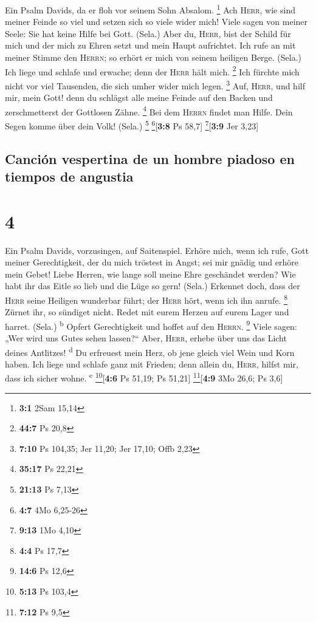  Ein Psalm Davids, da er floh vor seinem Sohn Absalom.
\footnote{\textbf{3:1} 2Sam 15,14}  Ach \textsc{Herr}, wie
sind meiner Feinde so viel und setzen sich so viele wider mich!
 Viele sagen von meiner Seele: Sie hat keine Hilfe bei
Gott. (Sela.)  Aber du, \textsc{Herr}, bist der Schild für
mich und der mich zu Ehren setzt und mein Haupt aufrichtet.
 Ich rufe an mit meiner Stimme den \textsc{Herrn}; so
erhört er mich von seinem heiligen Berge. (Sela.)  Ich
liege und schlafe und erwache; denn der \textsc{Herr} hält mich.
\footnote{\textbf{44:7} Ps 20,8}  Ich fürchte mich nicht
vor viel Tausenden, die sich umher wider mich legen. \footnote{\textbf{7:10}
  Ps 104,35; Jer 11,20; Jer 17,10; Offb 2,23}  Auf,
\textsc{Herr}, und hilf mir, mein Gott! denn du schlägst alle meine
Feinde auf den Backen und zerschmetterst der Gottlosen Zähne.
\footnote{\textbf{35:17} Ps 22,21}  Bei dem \textsc{Herrn}
findet man Hilfe. Dein Segen komme über dein Volk! (Sela.) \footnote{\textbf{21:13}
  Ps 7,13} \footnote{\textbf{4:7} 4Mo 6,25-26}{[}\textbf{3:8} Ps 58,7{]}
\footnote{\textbf{9:13} 1Mo 4,10}{[}\textbf{3:9} Jer 3,23{]}

\hypertarget{canciuxf3n-vespertina-de-un-hombre-piadoso-en-tiempos-de-angustia}{%
\subsection{Canción vespertina de un hombre piadoso en tiempos de
angustia}\label{canciuxf3n-vespertina-de-un-hombre-piadoso-en-tiempos-de-angustia}}

\hypertarget{section-3}{%
\section{4}\label{section-3}}

 Ein Psalm Davids, vorzusingen, auf Saitenspiel.
 Erhöre mich, wenn ich rufe, Gott meiner Gerechtigkeit,
der du mich tröstest in Angst; sei mir gnädig und erhöre mein Gebet!
 Liebe Herren, wie lange soll meine Ehre geschändet
werden? Wie habt ihr das Eitle so lieb und die Lüge so gern! (Sela.)
 Erkennet doch, dass der \textsc{Herr} seine Heiligen
wunderbar führt; der \textsc{Herr} hört, wenn ich ihn anrufe.
\footnote{\textbf{4:4} Ps 17,7}  Zürnet ihr, so sündiget
nicht. Redet mit eurem Herzen auf eurem Lager und harret. (Sela.)
\textsuperscript{b}  Opfert Gerechtigkeit und hoffet auf
den \textsc{Herrn}. \footnote{\textbf{14:6} Ps 12,6} 
Viele sagen: „Wer wird uns Gutes sehen lassen?{}`` Aber, \textsc{Herr},
erhebe über uns das Licht deines Antlitzes! \textsuperscript{d}
 Du erfreuest mein Herz, ob jene gleich viel Wein und Korn
haben.  Ich liege und schlafe ganz mit Frieden; denn
allein du, \textsc{Herr}, hilfst mir, dass ich sicher wohne.
\textsuperscript{e} \footnote{\textbf{5:13} Ps 103,4}{[}\textbf{4:6} Ps
51,19; Ps 51,21{]} \footnote{\textbf{7:12} Ps 9,5}{[}\textbf{4:9} 3Mo
26,6; Ps 3,6{]}

